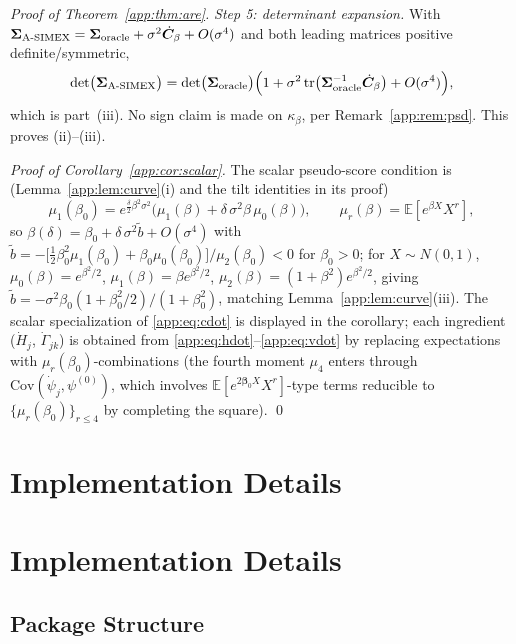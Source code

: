 \documentclass[11pt]{article}
\theoremstyle{plain}
\theoremstyle{definition}
\newcommand{\E}{\mathbb{E}}
\newcommand{\Cov}{\mathrm{Cov}}
\newcommand{\bet}{\bm{\beta}}
\newcommand{\bSig}{\bm{\Sigma}}
\newcommand{\asimex}{\textup{A-SIMEX}}
\begin{document}
\begin{proof}[Proof of Theorem~\ref{app:thm:are}]
\emph{Step 5: determinant expansion.} With
$\bSig_{\asimex}=\bSig_{\mathrm{oracle}}+\sigma^2\dot{\bm C}_\beta
+O(\sigma^4)$ and both leading matrices positive definite/symmetric,
\[
  \det\bigl(\bSig_{\asimex}\bigr)
  =\det\bigl(\bSig_{\mathrm{oracle}}\bigr)
   \Bigl(1+\sigma^2\operatorname{tr}\bigl(
     \bSig_{\mathrm{oracle}}^{-1}\dot{\bm C}_\beta\bigr)
   +O(\sigma^4)\Bigr),
\]
which is part~(iii). No sign claim is made on
$\kappa_\beta$, per Remark~\ref{app:rem:psd}. This proves (ii)--(iii).

\emph{Proof of Corollary~\ref{app:cor:scalar}.} The scalar pseudo-score
condition is (Lemma~\ref{app:lem:curve}(i) and the tilt identities in its
proof)
\[
  \mu_1(\beta_0)=e^{\frac{\delta}{2}\beta^2\sigma^2}
  \bigl(\mu_1(\beta)+\delta\,\sigma^2\beta\,\mu_0(\beta)\bigr),
  \qquad \mu_r(\beta)=\E[e^{\beta X}X^r],
\]
so $\beta(\delta)=\beta_0+\delta\,\sigma^2\tilde b+O(\sigma^4)$ with
$\tilde b=-\bigl[\tfrac12\beta_0^{2}\mu_1(\beta_0)
+\beta_0\mu_0(\beta_0)\bigr]/\mu_2(\beta_0)<0$ for $\beta_0>0$; for
$X\sim N(0,1)$, $\mu_0(\beta)=e^{\beta^2/2}$,
$\mu_1(\beta)=\beta e^{\beta^2/2}$,
$\mu_2(\beta)=(1+\beta^2)e^{\beta^2/2}$, giving
$\tilde b=-\sigma^2\beta_0(1+\beta_0^2/2)/(1+\beta_0^2)$, matching
Lemma~\ref{app:lem:curve}(iii). The scalar specialization of
\eqref{app:eq:cdot} is displayed in the corollary; each ingredient
($\dot H_j$, $\dot\Gamma_{jk}$) is obtained from
\eqref{app:eq:hdot}--\eqref{app:eq:vdot} by replacing expectations with
$\mu_r(\beta_0)$-combinations (the fourth moment $\mu_4$ enters through
$\Cov(\dot\psi_j,\psi^{(0)})$, which involves
$\E[e^{2\bet_0X}X^r]$-type terms reducible to $\{\mu_r(\beta_0)\}_{r\le4}$
by completing the square). \qed
\end{proof}



\section{Implementation Details}\label{sec:impl}

\section{Implementation Details}\label{app:implementation}

\subsection*{Package Structure}\label{sec:package}
\end{document}
